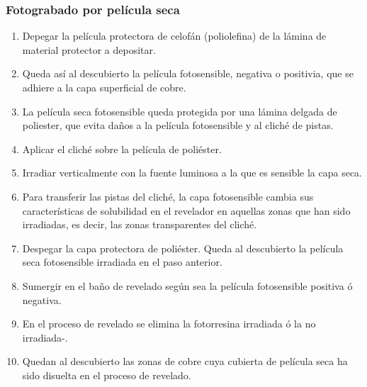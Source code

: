 \subsubsection{Fotograbado por película seca}
\begin{enumerate}
    \item Depegar la película protectora de celofán (poliolefina) de la lámina de material protector a depositar.
    \item Queda así al descubierto la película fotosensible, negativa o positivia, que se adhiere a la capa superficial de cobre.
    \item La película seca fotosensible queda protegida por una lámina delgada de poliester, que evita daños a la película fotosensible y al cliché de pistas.
    \item Aplicar el cliché sobre la película de poliéster.
    \item Irradiar verticalmente con la fuente luminosa a la que es sensible la capa seca.
    \item Para transferir las pistas del cliché, la capa fotosensible cambia sus características de solubilidad en el revelador en aquellas zonas que han sido irradiadas, es decir, las zonas transparentes del cliché.
    \item Despegar la capa protectora de poliéster. Queda al descubierto la película seca fotosensible irradiada en el paso anterior.
    \item Sumergir en el baño de revelado según sea la película fotosensible positiva ó negativa.
    \item En el proceso de revelado se elimina la fotorresina irradiada ó la no irradiada-.
    \item Quedan al descubierto las zonas de cobre cuya cubierta de película seca ha sido disuelta en el proceso de revelado.
\end{enumerate}

